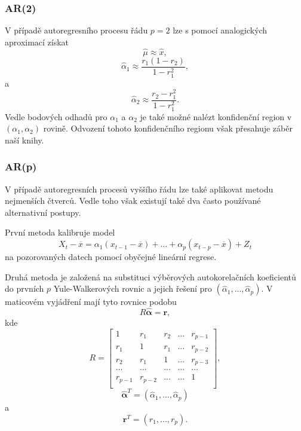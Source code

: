 \subsubsection{AR(2)}

V případě autoregresního procesu řádu $p = 2$ lze s pomocí analogických aproximací získat
\begin{equation}
\hat{\mu} \approx \hat{x},
\end{equation}
\begin{equation}
\hat{\alpha}_1 \approx \frac{r_1 (1 - r_2)}{1 - r_1^2},
\end{equation}
a
\begin{equation}
\hat{\alpha}_2 \approx \frac{r_2 - r_1^2}{1 - r_1^2}.
\end{equation}
Vedle bodových odhadů pro $\alpha_1$ a $\alpha_2$ je také možné nalézt konfidenční region v $(\alpha_1, \alpha_2)$ rovině. Odvození tohoto konfidenčního regionu však přesahuje záběr naší knihy.

\subsubsection{AR(p)}

V případě autoregresních procesů vyššího řádu lze také aplikovat metodu nejmenších čtverců. Vedle toho však existují také dva často používané alternativní postupy.

První metoda kalibruje model
\begin{equation}
X_t - \overline{x} = \alpha_1(x_{t-1} - \overline{x}) + ... + \alpha_p(x_{t-p} - \overline{x}) + Z_t
\end{equation}
na pozorovaných datech pomocí obyčejné lineární regrese.

Druhá metoda je založená na substituci výběrových autokorelačních koeficientů do prvních $p$ Yule-Walkerových rovnic a jejich řešení pro $(\hat{\alpha}_1, ..., \hat{\alpha}_p)$. V maticovém vyjádření mají tyto rovnice podobu
\begin{equation}
R \pmb{\hat{\alpha}} = \pmb{r},
\end{equation}
kde
\begin{equation}
R =
\begin{bmatrix}
1 & r_1 & r_2 & ... & r_{p-1}\\
r_1 & 1 & r_1 & ... & r_{p-2}\\
r_2 & r_1 & 1 & ... & r_{p-3}\\
... & ... & ... & ... & ...\\
r_{p-1} & r_{p-2} & ... & ... & 1\\
\end{bmatrix},
\end{equation}
\begin{equation}
\pmb{\hat{\alpha}}^T = (\hat{\alpha}_1, ..., \hat{\alpha}_p)
\end{equation}
a
\begin{equation}
\pmb{r}^T = (r_1, ..., r_p).
\end{equation}

